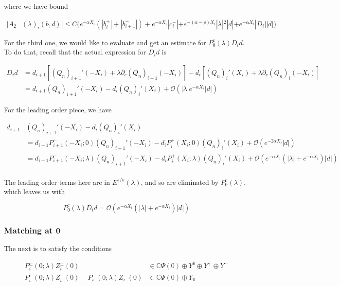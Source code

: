 \documentclass[12pt]{article}
\def\C{{\mathbb C}}
\begin{document}
where we have bound

\begin{align*}
|A_2&(\lambda)_i(b, d)|
\leq C \Big( e^{-\alpha X_i} (|b_i^+| + |b_{i+1}^-|) + e^{-\alpha X_i} |c_i^-| + e^{-(\alpha - \rho) X_i} |\lambda|^2|d| + e^{-\alpha X_i} |D_i||d| \Big)
\end{align*} 

For the third one, we would like to evaluate and get an estimate for $P_0^c(\lambda) D_i d$. To do that, recall that the actual expression for $D_i d$ is 

\begin{align*}
D_i d &= d_{i+1}[(Q_n)_{i+1}'(-X_i) + \lambda \partial_c (Q_n)_{i+1}(-X_i)]
- d_i [ (Q_n)_i'(X_i) + \lambda \partial_c (Q_n)_i(-X_i) ] \\
&= d_{i+1} (Q_n)_{i+1}'(-X_i) - d_i (Q_n)_i'(X_i) + \mathcal{O}(|\lambda|e^{-\alpha X_i}|d|)
\end{align*}

For the leading order piece, we have

\begin{align*}
d_{i+1} &(Q_n)_{i+1}'(-X_i) - d_i (Q_n)_i'(X_i) \\
&= d_{i+1} P_{i+1}^-(-X_i; 0)(Q_n)_{i+1}'(-X_i) - d_i P_i^+(X_i; 0)(Q_n)_i'(X_i) + \mathcal{O}(e^{-2 \alpha X_i}|d|) \\
&= d_{i+1} P_{i+1}^-(-X_i; \lambda)(Q_n)_{i+1}'(-X_i) - d_i P_i^+(X_i; \lambda)(Q_n)_i'(X_i) + \mathcal{O}(e^{-\alpha X_i}(|\lambda| + e^{-\alpha X_i})|d|)\\
\end{align*}

The leading order terms here are in $E^{s/u}(\lambda)$, and so are eliminated by $P_0^c(\lambda)$, which leaves us with

\[
P_0^c(\lambda) D_i d = \mathcal{O}(e^{-\alpha X_i}(|\lambda| + e^{-\alpha X_i})|d|)
\]

\subsubsection*{Matching at 0}

The next is to satisfy the conditions

\begin{align*}
P_i^\pm(0; \lambda) Z_i^\pm(0) &\in \C \Psi(0) \oplus Y^0 \oplus Y^+ \oplus Y^- \\
P_i^+(0; \lambda) Z_i^+(0) - P_i^-(0; \lambda) Z_i^-(0) &\in \C \Psi(0) \oplus Y_0
\end{align*}
\end{document}

